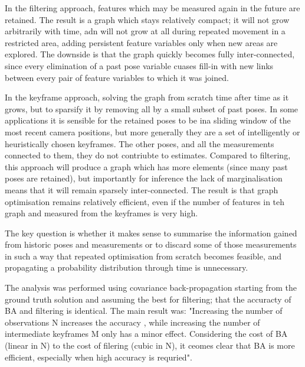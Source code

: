 In the filtering approach, features which may be measured again in the future
are retained. The result is a graph which stays relatively compact; it will not
grow arbitrarily with time, adn will not grow at all during repeated movement
in a restricted area, adding persistent feature variables only when new areas
are explored. The downside is that the graph quickly becomes fully
inter-connected, since every elimination of a past pose variable cuases fill-in
with new links between every pair of feature variables to which it was joined.

In the keyframe approach, solving the graph from scratch time after time as it
grows, but to sparsify it by removing all by a small subset of past poses. In
some applications it is sensible for the retained poses to be ina  sliding
window of the most recent camera positions, but more generally they are a set
of intelligently or heuristically chosen keyframes. The other poses, and all
the measurements connected to them, they do not contriubte to estimates.
Compared to filtering, this approach will produce a graph which has more
elements (since many past poses are retained), but importantly for inference
the lack of marginalisation means that it will remain sparsely inter-connected.
The result is that graph optimisation remains relatively efficient, even if the
number of features in teh graph and measured from the keyframes is very high.

The key question is whether it makes sense to summarise the information gained
from historic poses and measurements or to discard some of those measurements
in such a way that repeated optimisation from scratch becomes feasible, and
propagating a probability distribution through time is unnecessary.


The analysis was performed using covariance back-propagation starting from the
ground truth solution and assuming the best for filtering; that the accuracty
of BA and filtering is identical. The main result was: "Increasing the number
of observations N increases the accuracy , while increasing the number of
intermediate keyframes M only has a minor effect. Considering the cost of BA
(linear in N) to the cost of filering (cubic in N), it ceomes clear that BA is
more efficient, especially when high accuracy is requried".
